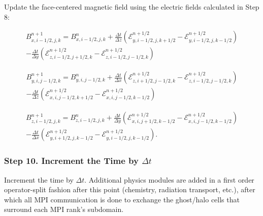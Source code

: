 \documentclass[modern]{aastex631}
\begin{document}
Update the face-centered magnetic field using the electric fields calculated in Step 8:

\begin{equation}
    \begin{aligned}
        B^{n+1}_{x,i-1/2,j,k} = B^{n}_{x,i-1/2,j,k}
        + \frac{\Delta t}{\Delta z} \left( \mathcal{E}^{n+1/2}_{y,i-1/2,j,k+1/2} - \mathcal{E}^{n+1/2}_{y,i-1/2,j,k-1/2} \right) \\
        - \frac{\Delta t}{\Delta y} \left( \mathcal{E}^{n+1/2}_{z,i-1/2,j+1/2,k} - \mathcal{E}^{n+1/2}_{z,i-1/2,j-1/2,k} \right)
    \end{aligned}
\end{equation}

\begin{equation}
    \begin{aligned}
        B^{n+1}_{y,i,j-1/2,k} = B^{n}_{y,i,j-1/2,k}
        + \frac{\Delta t}{\Delta x} \left( \mathcal{E}^{n+1/2}_{z,i+1/2,j-1/2,k} - \mathcal{E}^{n+1/2}_{z,i-1/2,j-1/2,k} \right) \\
        - \frac{\Delta t}{\Delta z} \left( \mathcal{E}^{n+1/2}_{x,i,j-1/2,k+1/2} - \mathcal{E}^{n+1/2}_{x,i,j-1/2,k-1/2} \right)
    \end{aligned}
\end{equation}

\begin{equation}
    \begin{aligned}
        B^{n+1}_{z,i-1/2,j,k} = B^{n}_{z,i-1/2,j,k}
        + \frac{\Delta t}{\Delta y} \left( \mathcal{E}^{n+1/2}_{x,i,j+1/2,k-1/2} - \mathcal{E}^{n+1/2}_{x,i,j-1/2,k-1/2} \right) \\
        - \frac{\Delta t}{\Delta x} \left( \mathcal{E}^{n+1/2}_{y,i+1/2,j,k-1/2} - \mathcal{E}^{n+1/2}_{y,i-1/2,j,k-1/2} \right).
    \end{aligned}
\end{equation}

\subsubsection{Step 10. Increment the Time by \texorpdfstring{$\Delta t$}{dt}}
\label{vlct:increment-time}

Increment the time by $\Delta t$. Additional physics modules are added in a first order operator-split fashion after this point (chemistry, radiation transport, etc.), after which all MPI communication is done to exchange the ghost/halo cells that surround each MPI rank's subdomain.
\end{document}
